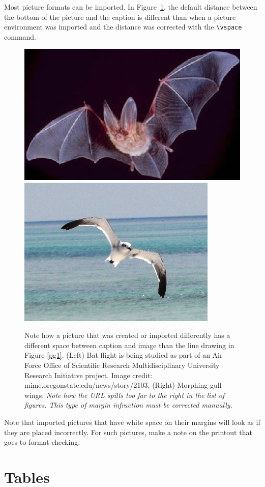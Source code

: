 Most picture formats can be imported. In Figure~\ref{batgull2},
the default distance between the bottom of the picture and the
caption is different than when a picture environment was imported
and the distance was corrected with the \verb+\vspace+ command.



\begin{figure}[hbt] %
\begin{center}
\includegraphics[width=.45\linewidth]{figs/bat_b.eps}\hspace*{0.04in}
\includegraphics[width=.36\linewidth]{figs/gull2_b.eps}\\
\end{center}
\vspace{-.1in}

\caption
{
Note how a picture that was created or imported differently has a different
space between caption and image than the line drawing in Figure
\protect\ref{pg1}. (Left) Bat flight is being studied as part of an
Air Force Office of Scientific Research Multidisciplinary
University Research Initiative project.
Image credit: mime.oregonstate.edu/news/story/2103, (Right)
Morphing gull wings.
{\em Note how the URL spills too far to the right in the
list of figures. This type of margin infraction must be
corrected manually.}}
\label{batgull2}
\end{figure}



Note that imported pictures that have white space on their margins
will look
as if they are placed incorrectly. For such pictures,
make a note on the printout that goes to format checking.


\newpage
\section{Tables}

